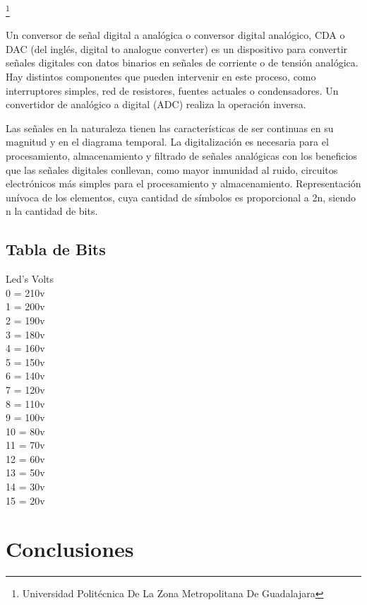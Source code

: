 \documentclass[10pt,a4paper]{article}
\begin{document}
\footnote{Universidad Politécnica De La Zona Metropolitana De Guadalajara} 

\newpage


Un conversor de señal digital a analógica o conversor digital analógico, CDA o DAC (del inglés, digital to analogue converter) es un dispositivo para convertir señales digitales con datos binarios en señales de corriente o de tensión analógica. Hay distintos componentes que pueden intervenir en este proceso, como interruptores simples, red de resistores, fuentes actuales o condensadores. Un convertidor de analógico a digital (ADC) realiza la operación inversa.

Las señales en la naturaleza tienen las características de ser continuas en su magnitud y en el diagrama temporal. La digitalización es necesaria para el procesamiento, almacenamiento y filtrado de señales analógicas con los beneficios que las señales digitales conllevan, como mayor inmunidad al ruido, circuitos electrónicos más simples para el procesamiento y almacenamiento. Representación unívoca de los elementos, cuya cantidad de símbolos es proporcional a 2n, siendo n la cantidad de bits.


\subsection{Tabla de Bits}
Led's    Volts\\
 0 =      210v\\
 1 =      200v\\
 2 =      190v\\
 3 =      180v\\
 4 =      160v\\
 5 =      150v\\
 6 =      140v\\
 7 =      120v\\
 8 =      110v\\
 9 =      100v\\
 10 =     80v\\
 11 =     70v\\
 12 =     60v\\
 13 =     50v\\
 14 =     30v\\
 15 =     20v

\section{Conclusiones}
\end{document}

